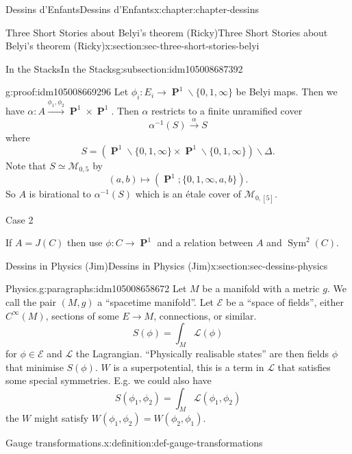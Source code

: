 \documentclass[oneside,10pt,]{book}
\numberwithin{equation}{section}
\newcommand{\cinf}{C^\infty}
\newcommand{\inv}{^{-1}}
\newcommand{\lb}{[}
\newcommand{\rb}{]}
\DeclareMathOperator{\PP}{\mathbf{P}}
\DeclareMathOperator{\Sym}{Sym}
\begin{document}
\begin{chapterptx}{Dessins d'Enfants}{}{Dessins d'Enfants}{}{}{x:chapter:chapter-dessins}
\begin{sectionptx}{Three Short Stories about Belyi's theorem (Ricky)}{}{Three Short Stories about Belyi's theorem (Ricky)}{}{}{x:section:sec-three-short-stories-belyi}
\begin{subsectionptx}{In the Stacks}{}{In the Stacks}{}{}{g:subsection:idm105008687392}
\begin{proofptx}{}{g:proof:idm105008669296}
Let \(\phi_i \colon E_i \to \PP^1\smallsetminus \{0,1,\infty\}\) be Belyi maps. Then we have \(\alpha \colon A \xrightarrow{\phi_1,\phi_2} \PP^1 \times \PP^1\). Then \(\alpha\) restricts to a finite unramified cover%
\begin{equation*}
\alpha\inv (S) \xrightarrow \alpha S
\end{equation*}
where%
\begin{equation*}
S = (\PP^1 \smallsetminus \{0,1,\infty\} \times \PP^1 \smallsetminus \{0,1,\infty\}) \smallsetminus \Delta\text{.}
\end{equation*}
Note that \(S \simeq \mathcal M_{0,5}\) by%
\begin{equation*}
(a,b ) \mapsto (\PP^1; \{0,1,\infty, a,b\})\text{.}
\end{equation*}
So \(A\) is birational to \(\alpha\inv (S)\) which is an étale cover of \(\mathcal M_{0,\lb 5 \rb}\).%
\par
Case 2%
\par
If \(A = J(C)\) then use \(\phi \colon C \to \PP^1\) and a relation between \(A\) and \(\Sym^2(C)\).%
\end{proofptx}
\end{subsectionptx}
\end{sectionptx}
%
%
\typeout{************************************************}
\typeout{************************************************}
%
\begin{sectionptx}{Dessins in Physics (Jim)}{}{Dessins in Physics (Jim)}{}{}{x:section:sec-dessins-physics}
\begin{paragraphs}{Physics.}{g:paragraphs:idm105008658672}%
Let  \(M\)  be a manifold with  a metric \(g\). We call the pair \((M,g)\) a ``spacetime manifold''. Let \(\mathcal E\) be  a ``space of fields'', either \(\cinf (M)\), sections of some \(E\to M\), connections, or similar.%
\begin{equation*}
S(\phi) = \int_M \mathcal    L (\phi)
\end{equation*}
for \(\phi\in \mathcal E\) and \(\mathcal L\) the Lagrangian. ``Physically realisable states'' are then fields \(\phi\) that minimise \(S(\phi)\). \(W\) is a superpotential, this is a term in \(\mathcal L\) that satisfies some special symmetries. E.g. we could also have%
\begin{equation*}
S(\phi_1, \phi_2) = \int_M \mathcal L(\phi_1,\phi_2)
\end{equation*}
the \(W\) might satisfy \(W(\phi_1, \phi_2) = W(\phi_2, \phi_1)\).%
\begin{definition}{Gauge transformations.}{x:definition:def-gauge-transformations}%

\end{definition}
\end{paragraphs}
\end{sectionptx}
\end{chapterptx}
\end{document}
